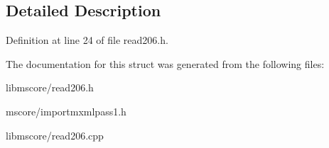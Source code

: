\subsection{Detailed Description}


Definition at line 24 of file read206.\+h.



The documentation for this struct was generated from the following files\+:\begin{DoxyCompactItemize}
\item 
libmscore/read206.\+h\item 
mscore/importmxmlpass1.\+h\item 
libmscore/read206.\+cpp\end{DoxyCompactItemize}
